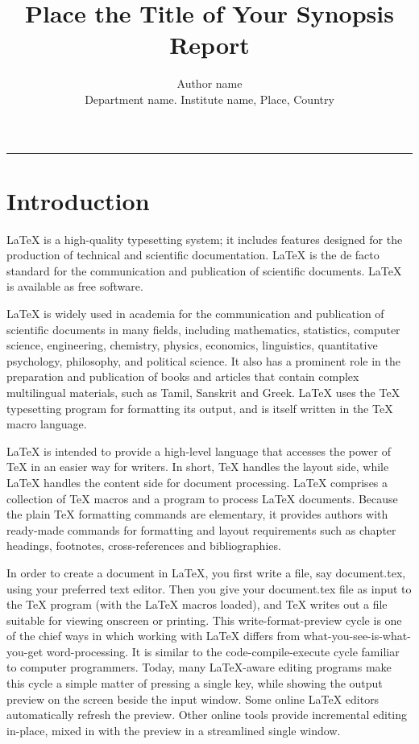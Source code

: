 \documentclass[11pt, a4paper]{article}
\title{\vskip-2.5cm Place the Title of Your Synopsis Report\vskip-5mm}
\author{Author name\\ Department name. Institute name, Place, Country}\date{}
\begin{document}
\maketitle\hrule

\tableofcontents

\section{Introduction}\label{sec:intro}
LaTeX is a high-quality typesetting system; it includes features designed for the production of technical and scientific documentation. LaTeX is the de facto standard for the communication and publication of scientific documents. LaTeX is available as free software.

LaTeX is widely used in academia for the communication and publication of scientific documents in many fields, including mathematics, statistics, computer science, engineering, chemistry, physics, economics, linguistics, quantitative psychology, philosophy, and political science. It also has a prominent role in the preparation and publication of books and articles that contain complex multilingual materials, such as Tamil, Sanskrit and Greek. LaTeX uses the TeX typesetting program for formatting its output, and is itself written in the TeX macro language.

LaTeX is intended to provide a high-level language that accesses the power of TeX in an easier way for writers. In short, TeX handles the layout side, while LaTeX handles the content side for document processing. LaTeX comprises a collection of TeX macros and a program to process LaTeX documents. Because the plain TeX formatting commands are elementary, it provides authors with ready-made commands for formatting and layout requirements such as chapter headings, footnotes, cross-references and bibliographies.

In order to create a document in LaTeX, you first write a file, say document.tex, using your preferred text editor. Then you give your document.tex file as input to the TeX program (with the LaTeX macros loaded), and TeX writes out a file suitable for viewing onscreen or printing. This write-format-preview cycle is one of the chief ways in which working with LaTeX differs from what-you-see-is-what-you-get word-processing. It is similar to the code-compile-execute cycle familiar to computer programmers. Today, many LaTeX-aware editing programs make this cycle a simple matter of pressing a single key, while showing the output preview on the screen beside the input window. Some online LaTeX editors automatically refresh the preview. Other online tools provide incremental editing in-place, mixed in with the preview in a streamlined single window.
\end{document}
